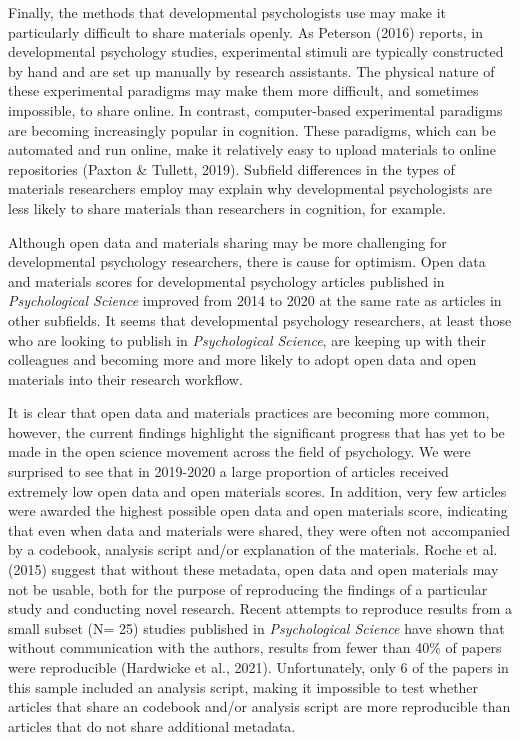\documentclass[
  english,
  man,floatsintext]{apa6}
\begin{document}
Finally, the methods that developmental psychologists use may make it particularly difficult to share materials openly. As Peterson (2016) reports, in developmental psychology studies, experimental stimuli are typically constructed by hand and are set up manually by research assistants. The physical nature of these experimental paradigms may make them more difficult, and sometimes impossible, to share online. In contrast, computer-based experimental paradigms are becoming increasingly popular in cognition. These paradigms, which can be automated and run online, make it relatively easy to upload materials to online repositories (Paxton \& Tullett, 2019). Subfield differences in the types of materials researchers employ may explain why developmental psychologists are less likely to share materials than researchers in cognition, for example.

Although open data and materials sharing may be more challenging for developmental psychology researchers, there is cause for optimism. Open data and materials scores for developmental psychology articles published in \emph{Psychological Science} improved from 2014 to 2020 at the same rate as articles in other subfields. It seems that developmental psychology researchers, at least those who are looking to publish in \emph{Psychological Science}, are keeping up with their colleagues and becoming more and more likely to adopt open data and open materials into their research workflow.

It is clear that open data and materials practices are becoming more common, however, the current findings highlight the significant progress that has yet to be made in the open science movement across the field of psychology. We were surprised to see that in 2019-2020 a large proportion of articles received extremely low open data and open materials scores. In addition, very few articles were awarded the highest possible open data and open materials score, indicating that even when data and materials were shared, they were often not accompanied by a codebook, analysis script and/or explanation of the materials. Roche et al. (2015) suggest that without these metadata, open data and open materials may not be usable, both for the purpose of reproducing the findings of a particular study and conducting novel research. Recent attempts to reproduce results from a small subset (N= 25) studies published in \emph{Psychological Science} have shown that without communication with the authors, results from fewer than 40\% of papers were reproducible (Hardwicke et al., 2021). Unfortunately, only 6 of the papers in this sample included an analysis script, making it impossible to test whether articles that share an codebook and/or analysis script are more reproducible than articles that do not share additional metadata.
\end{document}
